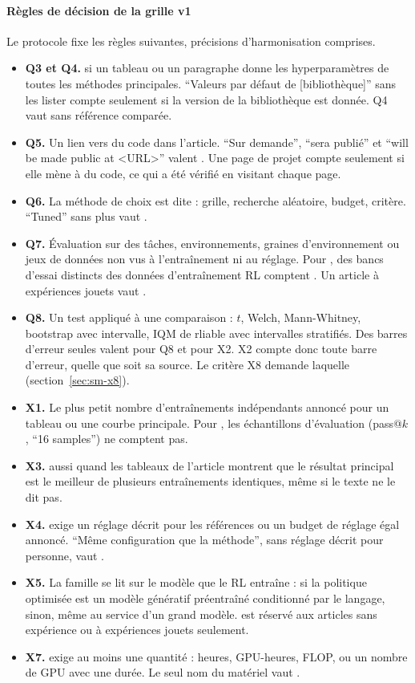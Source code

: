 \paragraph{Règles de décision de la grille v1}
Le protocole fixe les règles suivantes, précisions d'harmonisation comprises.
\begin{itemize}
  \item \textbf{Q3 et Q4.}  si un tableau ou un paragraphe donne les hyperparamètres de toutes
  les méthodes principales. \enquote{Valeurs par défaut de [bibliothèque]} sans les lister compte
   seulement si la version de la bibliothèque est donnée. Q4 vaut  sans référence
  comparée.
  \item \textbf{Q5.} Un lien vers du code dans l'article. \enquote{Sur demande}, \enquote{sera publié}
  et \enquote{will be made public at <URL>} valent . Une page de projet compte 
  seulement si elle mène à du code, ce qui a été vérifié en visitant chaque page.
  \item \textbf{Q6.} La méthode de choix est dite : grille, recherche aléatoire, budget, critère.
  \enquote{Tuned} sans plus vaut .
  \item \textbf{Q7.} Évaluation sur des tâches, environnements, graines d'environnement ou jeux de
  données non vus à l'entraînement ni au réglage. Pour , des bancs d'essai distincts des
  données d'entraînement RL comptent . Un article  à expériences jouets vaut
  .
  \item \textbf{Q8.} Un test appliqué à une comparaison : $t$, Welch, Mann-Whitney, bootstrap avec
  intervalle, IQM de rliable avec intervalles stratifiés. Des barres d'erreur seules valent 
  pour Q8 et  pour X2. X2 compte donc toute barre d'erreur, quelle que soit sa source. Le
  critère X8 demande laquelle (section~\ref{sec:sm-x8}).
  \item \textbf{X1.} Le plus petit nombre d'entraînements indépendants annoncé pour un tableau ou une
  courbe principale. Pour , les échantillons d'évaluation (pass@$k$, \enquote{16 samples})
  ne comptent pas.
  \item \textbf{X3.}  aussi quand les tableaux de l'article montrent que le résultat principal
  est le meilleur de plusieurs entraînements identiques, même si le texte ne le dit pas.
  \item \textbf{X4.}  exige un réglage décrit pour les références ou un budget de réglage
  égal annoncé. \enquote{Même configuration que la méthode}, sans réglage décrit pour personne, vaut
  .
  \item \textbf{X5.} La famille se lit sur le modèle que le RL entraîne :  si la
  politique optimisée est un modèle génératif préentraîné conditionné par le langage, 
  sinon, même au service d'un grand modèle.  est réservé aux articles sans expérience ou à
  expériences jouets seulement.
  \item \textbf{X7.}  exige au moins une quantité : heures, GPU-heures, FLOP, ou un nombre de
  GPU avec une durée. Le seul nom du matériel vaut .
\end{itemize}

